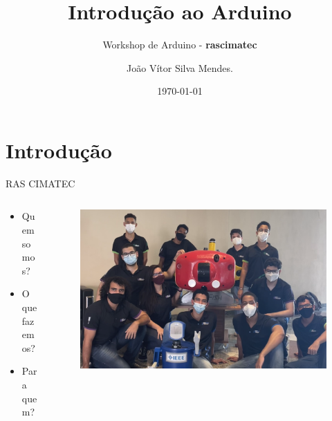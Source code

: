 \documentclass{cubeamer}
\title{Introdução ao Arduino}
\subtitle{Workshop de Arduino - \textbf{rascimatec}}
\author[João Vítor Silva Mendes]{João Vítor Silva Mendes.}
\date{\today} %
\institute[SENAI CIMATEC]{SENAI CIMATEC - IEEE ROBOTICS AND AUTOMATION SOCIETY}
\begin{document}
\maketitle

\cutoc

\section{Introdução}

\begin{frame}{RAS CIMATEC}
    \begin{columns}

        \begin{column}{0.4\textwidth}
            \begin{itemize}
                \item Quem somos?
                \item O que fazemos?
                \item Para quem?
            \end{itemize}
        \end{column}

        \begin{column}{0.6\textwidth}
            \begin{figure}
                \centering
                \includegraphics[height = 0.6\textheight]{img/team2.png}
            \end{figure}
        \end{column}

    \end{columns}
\end{frame}
\end{document}
